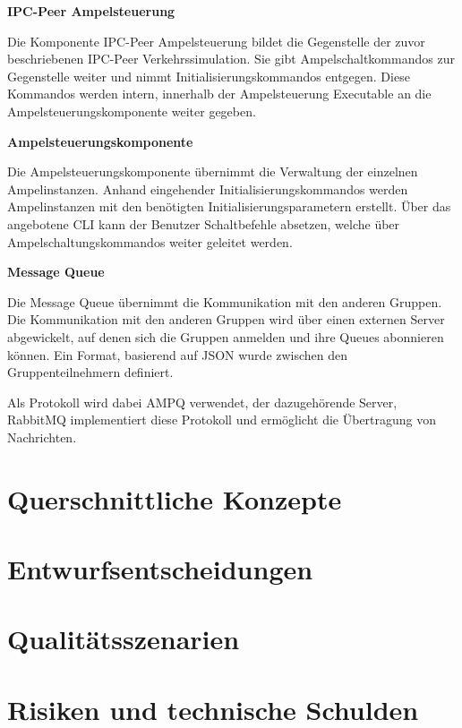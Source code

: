 \begin{flushleft}
\textbf{IPC-Peer Ampelsteuerung}
\end{flushleft}
\vspace{-0.3 cm}

Die Komponente IPC-Peer Ampelsteuerung bildet die Gegenstelle der zuvor beschriebenen IPC-Peer Verkehrssimulation. Sie gibt Ampelschaltkommandos zur Gegenstelle weiter und nimmt Initialisierungskommandos entgegen. Diese Kommandos werden intern, innerhalb der Ampelsteuerung Executable an die Ampelsteuerungskomponente weiter gegeben.

\begin{flushleft}
\textbf{Ampelsteuerungskomponente}
\end{flushleft}
\vspace{-0.3 cm}

Die Ampelsteuerungskomponente übernimmt die Verwaltung der einzelnen Ampelinstanzen. Anhand eingehender Initialisierungskommandos werden Ampelinstanzen mit den benötigten Initialisierungsparametern erstellt. Über das angebotene CLI kann der Benutzer Schaltbefehle absetzen, welche über Ampelschaltungskommandos weiter geleitet werden.

\begin{flushleft}
\textbf{Message Queue}
\end{flushleft}
\vspace{-0.3 cm}

Die Message Queue übernimmt die Kommunikation mit den anderen Gruppen. Die Kommunikation mit den anderen Gruppen wird über einen externen Server abgewickelt, auf denen sich die Gruppen anmelden und ihre Queues abonnieren können. Ein Format, basierend auf JSON wurde zwischen den Gruppenteilnehmern definiert.

Als Protokoll wird dabei AMPQ verwendet, der dazugehörende Server, RabbitMQ implementiert diese Protokoll und ermöglicht die Übertragung von Nachrichten.

\section{Querschnittliche Konzepte}
\label{Querschnittliche Konzepte}

\section{Entwurfsentscheidungen}
\label{Entwurfsentscheidungen}

\section{Qualitätsszenarien}
\label{Qualitätsszenarien}

\section{Risiken und technische Schulden}
\label{Risiken und technische Schulden}